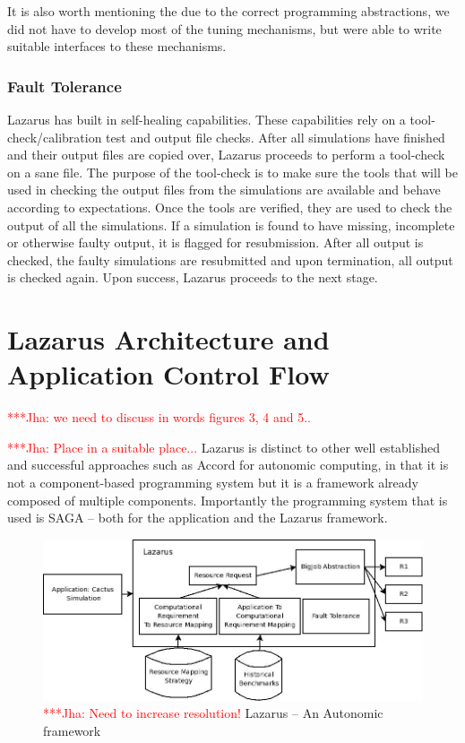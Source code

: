 \documentclass[conference,final]{IEEEtran}
\newcommand{\jhanote}[1]{ {\textcolor{red} { ***Jha: #1 }}}
\newcommand{\jhanote}[1]{}
\begin{document}
It is also worth mentioning the due to the correct programming
abstractions, we did not have to develop most of the tuning
mechanisms, but were able to write suitable interfaces to these
mechanisms.

\subsubsection{Fault Tolerance}
Lazarus has built in self-healing capabilities. These capabilities
rely on a tool-check/calibration test and output file checks. After
all simulations have finished and their output files are copied over,
Lazarus proceeds to perform a tool-check on a sane file. The purpose
of the tool-check is to make sure the tools that will be used in
checking the output files from the simulations are available and
behave according to expectations. Once the tools are verified, they
are used to check the output of all the simulations. If a simulation
is found to have missing, incomplete or otherwise faulty output, it is
flagged for resubmission.  After all output is checked, the faulty
simulations are resubmitted and upon termination, all output is
checked again. Upon success, Lazarus proceeds to the next stage.


\section{Lazarus Architecture and Application Control Flow}

\jhanote{we need to discuss in words figures 3, 4 and 5..}

\jhanote{Place in a suitable place...}  Lazarus is distinct to other
well established and successful approaches such as Accord for
autonomic computing, in that it is not a component-based programming
system but it is a framework already composed of multiple
components. Importantly the programming system that is used is SAGA --
both for the application and the Lazarus framework.

\begin{figure}
\begin{center}
\includegraphics[scale=0.3]{./figures/Lazarus_01.jpeg}
\end{center}
\caption{\jhanote{Need to increase resolution!}  Lazarus -- An
  Autonomic framework}

\label{fig:application_architecture}
\end{figure}
\end{document}
